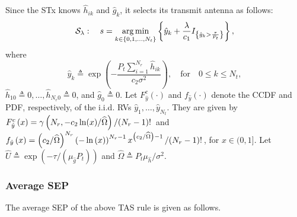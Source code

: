 \documentclass[12pt,draftcls,peerreview,onecolumn]{IEEEtran}
\newcommand{\cbrac}[1]{\left\{{#1}\right\}}
\newcommand{\indic}[1]{I_{\cbrac{#1}}}
\newcommand{\define}{\triangleq}
\DeclareMathOperator*{\argmin}{arg\,min}
\newcommand{\SEP}{\text{SEP}}
\newcommand{\nx}{{0}}
\newcommand{\lam}{\lambda}
\newcommand{\lamstar}{\lam^{*}}
\newcommand{\Nt}{{N_t}}
\newcommand{\Nr}{{N_r}}
\newcommand{\Pt}{{P_t}}
\newcommand{\such}{h}
\newcommand{\puch}{g}
\newcommand{\noisevar}{\sigma^2}
\newcommand{\outmax}{O_{\text{max}}}
\newcommand{\itau}{\tau}
\newcommand{\cone}{c_{1}}
\newcommand{\ctwo}{c_{2}}
\newcommand{\out}{O}
\newcommand{\taubypt}{\frac{\itau}{\Pt}}
\newcommand{\gkhatgrtaubypt}[1]{{\gkhat{#1}}>\taubypt}
\newcommand{\ghatindic}[1]{\indic{\gkhatgrtaubypt{#1}}}
\newcommand{\lambym}{\frac{\lam}{\cone}}
\newcommand{\lamstarbym}{\frac{\lamstar}{\cone}}
\newcommand{\ykhatplusgkhat}[1]{ \ykhat{#1} + \lambym\ghatindic{#1}}
\newcommand{\al}{\ctwo}
\newcommand{\snr}{\Omega}
\newcommand{\albysnr}[1][]{\frac{\al#1}{\snr}}
\newcommand{\un}{U}
\newcommand{\allopts}{\left\{\nx,1,\ldots,\Nt\right\}}
\newcommand{\callamrule}{{\cal S_{{\lam}}}}
\newcommand{\outlam}{\out_{\lam}}
\newcommand{\unhat}{\widehat{\un}}
\newcommand{\snrhat}{\widehat{\snr}}
\newcommand{\hhat}{\hat{\such}}
\newcommand{\ghat}{\hat{\puch}}
\newcommand{\yhat}{\hat{y}}
\newcommand{\hkhat}[1]{\hhat_{#1}}
\newcommand{\gkhat}[1]{\ghat_{#1}}
\newcommand{\ykhat}[1]{\hat{y}_{#1}}
\newcommand{\muhhat}{\mu_{\hhat}}
\newcommand{\mughat}{\mu_{\ghat}}
\newcommand{\ccdfghatinline}{\exp\left( {-{\itau}/{\left( \mughat\Pt\right) }}\right) }
\newcommand{\ccdfyhatrv}[1]{F^{c}_{\yhat}\left(#1 \right) }
\begin{document}
Since the STx knows $\hkhat{ik}$ and $\gkhat{k}$, it selects its transmit antenna as follows: 
\begin{equation}
\callamrule:\quad s=\argmin\limits_{k\in\allopts} \left\{ \ykhatplusgkhat{k} \right\},
\label{eq:shat}
\end{equation}
where 
\begin{equation}
\ykhat{k} \define  \exp\left({- \frac{\Pt\sum_{i=1}^{\Nr}\hkhat{ik}}{\ctwo\noisevar} }\right), \quad \text{for} \quad 0\leq k \leq\Nt,
\label{eq:yihat_def}
\end{equation}
$\hkhat{1\nx} \define 0,\ldots,\hkhat{\Nr\nx} \define 0$, and $\gkhat{\nx} \define 0$. Let $F_{\yhat}^{c}(\cdot)$ and $f_{\yhat}(\cdot)$ denote the CCDF and PDF, respectively, of the i.i.d. RVs $\ykhat{1},\dots,\ykhat{\Nt}$. They are given by $F_{\yhat}^{c}\left(x\right) =  {\gamma\left(\Nr,-\ctwo\ln(x)/\snrhat\right)} \left/ {(\Nr-1)!}\right.$ and $f_{\yhat}\left(x\right) = { \left( \ctwo/\snrhat \right)^{\Nr} \left(-\ln\left(x \right)\right)^{\Nr-1} x^{\left( \ctwo/\snrhat \right) - 1}}\left/{(\Nr-1)!}\right.$, for $x \in (0,1]$.  Let  $\unhat\define\ccdfghatinline$ and  $\snrhat\define{\Pt\muhhat}/{\noisevar}$.  


\newcommand{\D}{\Delta}

\newcommand{\pdfyhatNr}{\left(\ln\left(\frac{1}{x}\right)\right)^{\Nr-1}x^{\albysnr[]-1}} %
\newcommand{\yhattimespdfyNr}{\left[-\ln\left(x\right)\right]^{\Nr-1}x^{\D}} %
\newcommand{\yhatpluslamstartimespdfyNr}{\left[-\ln\left({x+\lamstarbym}\right)\right]^{\Nr-1}\left(x+\lamstarbym\right)^{\D}} %
\newcommand{\yhatpluslamtimespdfyNr}{\left[-\ln\left({x+\lambym}\right)\right]^{\Nr-1}\left(x+\lambym\right)^{\!\!\D}} %
\newcommand{\unccdfyhat}[2]{{#1}\,\,\ccdfyhatrv{#2}}


\newcommand{\avgSEPhat}{\widehat{\SEP}}

\subsubsection{ Average SEP} The average SEP of the above TAS rule is given as follows. 
\end{document}
